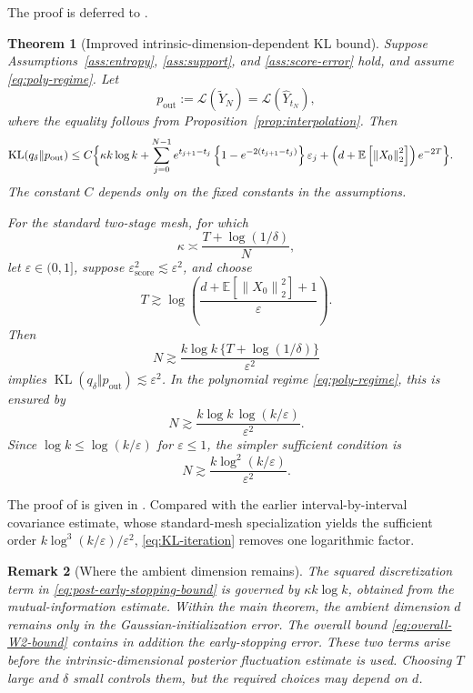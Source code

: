 \documentclass[11pt]{article}
\newtheorem{theorem}{Theorem}[section]
\newtheorem{remark}[theorem]{Remark}
\theoremstyle{definition}
\newcommand{\E}{\mathbb{E}}
\newcommand{\Law}{\mathcal{L}}
\newcommand{\norm}[1]{\left\lVert #1\right\rVert_2}
\newcommand{\KL}{\operatorname{KL}}
\newcommand{\scoreerr}{\varepsilon_{\mathrm{score}}}
\begin{document}
The proof is deferred to .

\begin{theorem}[Improved intrinsic-dimension-dependent KL bound]
\label{thm:main-KL}
Suppose Assumptions~\ref{ass:entropy}, \ref{ass:support}, and
\ref{ass:score-error} hold, and assume \eqref{eq:poly-regime}. Let
\[
    p_{\mathrm{out}}
    :=\Law(\widetilde Y_N)
    =\Law(\hat Y_{t_N}),
\]
where the equality follows from Proposition~\ref{prop:interpolation}.
Then
\begin{align}
    \KL(q_\delta\Vert p_{\mathrm{out}})
    \le C\Bigl\{
       &\kappa k\log k+{\sum_{j=0}^{N-1}e^{t_{j+1}-t_j}\left\{1-e^{-2(t_{j+1}-t_j)}\right\}\varepsilon_j}+\left(d+\E\left[\norm{X_0}^2\right]\right)e^{-2T}
    \Bigr\}.
    \label{eq:main-KL}
\end{align}
The constant $C$ depends only on the fixed constants in the
assumptions.

For the standard two-stage mesh, for which
\[
    \kappa\asymp\frac{T+\log(1/\delta)}{N},
\]
let $\varepsilon\in(0,1]$, suppose
$\scoreerr^2\lesssim\varepsilon^2$, and choose
\[
    T\gtrsim
    \log\left(
       \frac{d+\E\left[\norm{X_0}^2\right]+1}{\varepsilon}
    \right).
\]
Then
\begin{equation}
    N\gtrsim
    \frac{k\log k\,\{T+\log(1/\delta)\}}{\varepsilon^2}
    \label{eq:KL-iteration-general}
\end{equation}
implies
$\KL(q_\delta\Vert p_{\mathrm{out}})\lesssim\varepsilon^2$.
In the polynomial regime \eqref{eq:poly-regime}, this is ensured by
\begin{equation}
    N\gtrsim
    \frac{k\log k\,\log(k/\varepsilon)}{\varepsilon^2}.
    \label{eq:KL-iteration-sharp}
\end{equation}
Since $\log k\le\log(k/\varepsilon)$ for $\varepsilon\le1$, the
simpler sufficient condition is
\begin{equation}
    N\gtrsim
    \frac{k\log^2(k/\varepsilon)}{\varepsilon^2}.
    \label{eq:KL-iteration}
\end{equation}
\end{theorem}

The proof of  is given in . Compared
with the earlier interval-by-interval covariance estimate, whose
standard-mesh specialization yields the sufficient order
$k\log^3(k/\varepsilon)/\varepsilon^2$, \eqref{eq:KL-iteration}
removes one logarithmic factor.

\begin{remark}[Where the ambient dimension remains]
The squared discretization term in
\eqref{eq:post-early-stopping-bound} is governed by
$\kappa k\log k$, obtained from the mutual-information estimate.
Within the main theorem, the ambient dimension $d$ remains only in
the Gaussian-initialization error. The overall bound
\eqref{eq:overall-W2-bound} contains in addition the early-stopping
error. These two terms arise before the intrinsic-dimensional
posterior fluctuation estimate is used. Choosing $T$ large and
$\delta$ small controls them, but the required choices may depend on
$d$.
\end{remark}
\end{document}
